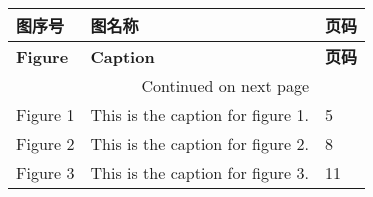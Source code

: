 \documentclass[a4paper,12pt]{lntu-thesis}
\begin{document}
	
\makecover


\begin{longtable}{|p{3cm}|p{10cm}|p{3cm}|}
	\hline
	\textbf{图序号} & \textbf{图名称}&\textbf{页码} \\ \hline
	\endfirsthead
	\hline
	\textbf{Figure} & \textbf{Caption}&\textbf{页码} \\ \hline
	\endhead
	\hline
	\multicolumn{2}{|r|}{{Continued on next page}} \\ \hline
	\endfoot
	\hline
	\endlastfoot
	Figure 1 & This is the caption for figure 1.&5 \\ \hline
	Figure 2 & This is the caption for figure 2.&8 \\ \hline
	Figure 3 & This is the caption for figure 3.&11 \\ \hline
\end{longtable}

%
%
%
%
\end{document}
